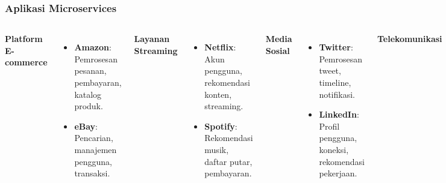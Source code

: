 \documentclass[aspectratio=169, table]{beamer}
\begin{document}
    \begin{frame}
        \frametitle{Aplikasi Microservices}
        \vspace{25pt}
        \begin{columns}
            \textbf{Platform E-commerce}
            \begin{itemize}
                \item \textbf{Amazon}: Pemrosesan pesanan, pembayaran, katalog produk.
                \item \textbf{eBay}: Pencarian, manajemen pengguna, transaksi.
            \end{itemize}
            \textbf{Layanan Streaming}
            \begin{itemize}
                \item \textbf{Netflix}: Akun pengguna, rekomendasi konten, streaming.
                \item \textbf{Spotify}: Rekomendasi musik, daftar putar, pembayaran.
            \end{itemize}

            \textbf{Media Sosial}
            \begin{itemize}
                \item \textbf{Twitter}: Pemrosesan tweet, timeline, notifikasi.
                \item \textbf{LinkedIn}: Profil pengguna, koneksi, rekomendasi pekerjaan.
            \end{itemize}
            \textbf{Telekomunikasi}
            \begin{itemize}
                \item \textbf{AT\&T}: Infrastruktur jaringan, layanan pelanggan, penagihan.
                \item \textbf{Verizon}: Manajemen jaringan, dukungan pelanggan.
            \end{itemize}
        \end{columns}
    \end{frame}
\end{document}
